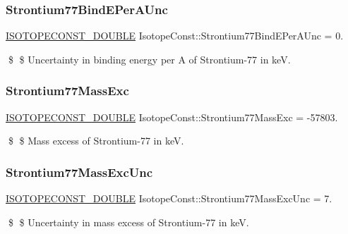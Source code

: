 \subsubsection{\texorpdfstring{Strontium77\+Bind\+E\+Per\+A\+Unc}{Strontium77BindEPerAUnc}}
{\footnotesize\ttfamily \mbox{\hyperlink{group___isotope_const-_macros_ga8f45a7272ce02c0b4c65c44636ed719a}{I\+S\+O\+T\+O\+P\+E\+C\+O\+N\+S\+T\+\_\+\+D\+O\+U\+B\+LE}} Isotope\+Const\+::\+Strontium77\+Bind\+E\+Per\+A\+Unc = 0.}

\$ \$ Uncertainty in binding energy per A of Strontium-\/77 in keV. \mbox{\label{group___isotope_const-_strontium-_sr77_gab59d163cbb990fb49c4058a5b5e5e6c3}} 
\subsubsection{\texorpdfstring{Strontium77\+Mass\+Exc}{Strontium77MassExc}}
{\footnotesize\ttfamily \mbox{\hyperlink{group___isotope_const-_macros_ga8f45a7272ce02c0b4c65c44636ed719a}{I\+S\+O\+T\+O\+P\+E\+C\+O\+N\+S\+T\+\_\+\+D\+O\+U\+B\+LE}} Isotope\+Const\+::\+Strontium77\+Mass\+Exc = -\/57803.}

\$ \$ Mass excess of Strontium-\/77 in keV. \mbox{\label{group___isotope_const-_strontium-_sr77_gae5098521090df0bd9eaf1a82b6cef756}} 
\subsubsection{\texorpdfstring{Strontium77\+Mass\+Exc\+Unc}{Strontium77MassExcUnc}}
{\footnotesize\ttfamily \mbox{\hyperlink{group___isotope_const-_macros_ga8f45a7272ce02c0b4c65c44636ed719a}{I\+S\+O\+T\+O\+P\+E\+C\+O\+N\+S\+T\+\_\+\+D\+O\+U\+B\+LE}} Isotope\+Const\+::\+Strontium77\+Mass\+Exc\+Unc = 7.}

\$ \$ Uncertainty in mass excess of Strontium-\/77 in keV. \mbox{\label{group___isotope_const-_strontium-_sr77_ga5b46df388dad19bc52711d429bc7f3b1}} 
